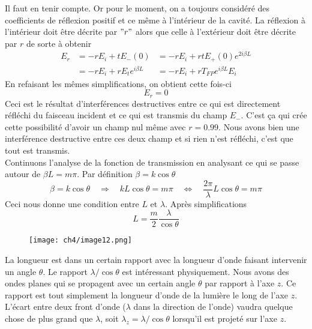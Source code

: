 Il faut en tenir compte. Or pour le moment, on a toujours considéré des coefficients de 
réflexion positif et ce même à l'intérieur de la cavité. La réflexion à l'intérieur doit 
être décrite par $"r"$ alors que celle à l'extérieur doit être décrite par $r$ de sorte à obtenir%
\begin{equation}
\begin{array}{lll}
E_r &= -rE_i+tE_-(0) &= -rE_i +rtE_+(0)e^{2i\beta L}\\
&= -rE_i + rE_te^{i\beta L} &= -rE_i+rT_{FP}e^{i\beta L}E_i
\end{array}
\end{equation}
En refaisant les mêmes simplifications, on obtient cette fois-ci 
\begin{equation}
E_r = 0
\end{equation}
Ceci est le résultat d'interférences destructives entre ce qui est directement réfléchi
du faisceau incident et ce qui est transmis du champ $E_-$. C'est ça qui crée cette 
possibilité d'avoir un champ nul même avec $r=0.99$. Nous avons bien une interférence 
destructive entre ces deux champ et si rien n'est réfléchi, c'est que tout est transmis.\\

Continuons l'analyse de la fonction de transmission en analysant ce qui se passe autour de 
$\beta L = m\pi$. Par définition $\beta = k\cos\theta$
\begin{equation}
\beta = k\cos\theta\quad\Rightarrow\quad kL\cos\theta = m\pi\quad\Leftrightarrow\quad 
\dfrac{2\pi}{\lambda}L\cos\theta = m\pi
\end{equation}
Ceci nous donne une condition entre $L$ et $\lambda$. Après simplifications
\begin{equation}
L = \frac{m}{2}\frac{\lambda}{\cos\theta}
\end{equation}

	\begin{wrapfigure}[7]{r}{4.5cm}
	\vspace{-5mm}
	\texttt{[image: ch4/image12.png]}
	\end{wrapfigure}
La longueur est dans un certain rapport avec la longueur d'onde faisant intervenir un 
angle $\theta$. Le rapport $\lambda/\cos\theta$ est intéressant physiquement. Nous avons 
des ondes planes qui se propagent avec un certain angle $\theta$ par rapport à l'axe $z$. Ce 
rapport est tout simplement la longueur d'onde de la lumière le long de l'axe $z$. L’écart 
entre deux front d'onde ($\lambda$ dans la direction de l'onde) vaudra quelque chose de plus 
grand que $\lambda$, soit $\lambda_z = \lambda/\cos\theta$ lorsqu'il est projeté sur l'axe $z$.\\

